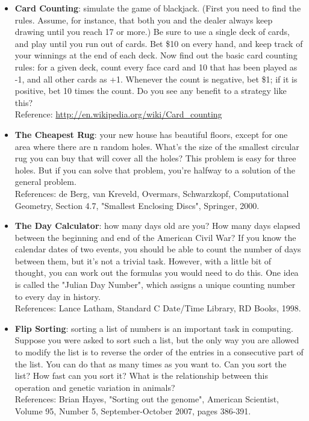 \documentclass{article}
\begin{document}
\begin{itemize}
    \item  \textbf{Card Counting}: simulate the game of blackjack. (First you need to find the rules. Assume, for instance, that both you and the dealer always keep drawing until you reach 17 or more.) Be sure to use a single deck of cards, and play until you run out of cards. Bet \$10 on every hand, and keep track of your winnings at the end of each deck. Now find out the basic card counting rules: for a given deck, count every face card and 10 that has been played as -1, and all other cards as +1. Whenever the count is negative, bet \$1; if it is positive, bet 10 times the count. Do you see any benefit to a strategy like this?\\ Reference: \url{http://en.wikipedia.org/wiki/Card_counting}
    
    \item \textbf{The Cheapest Rug}: your new house has beautiful floors, except for one area where there are n random holes. What's the size of the smallest circular rug you can buy that will cover all the holes? This problem is easy for three holes. But if you can solve that problem, you're halfway to a solution of the general problem. \\
    References: de Berg, van Kreveld, Overmars, Schwarzkopf, Computational Geometry, Section 4.7, "Smallest Enclosing Discs", Springer, 2000.
    
    \item \textbf{The Day Calculator}: how many days old are you? How many days elapsed between the beginning and end of the American Civil War? If you know the calendar dates of two events, you should be able to count the number of days between them, but it's not a trivial task. However, with a little bit of thought, you can work out the formulas you would need to do this. One idea is called the "Julian Day Number", which assigns a unique counting number to every day in history. \\
    References: Lance Latham, Standard C Date/Time Library, RD Books, 1998.
    
    \item \textbf{Flip Sorting}: sorting a list of numbers is an important task in computing. Suppose you were asked to sort such a list, but the only way you are allowed to modify the list is to reverse the order of the entries in a consecutive part of the list. You can do that as many times as you want to. Can you sort the list? How fast can you sort it? What is the relationship between this operation and genetic variation in animals? \\
    References: Brian Hayes, "Sorting out the genome", American Scientist, Volume 95, Number 5, September-October 2007, pages 386-391.
    

\end{itemize}
\end{document}
